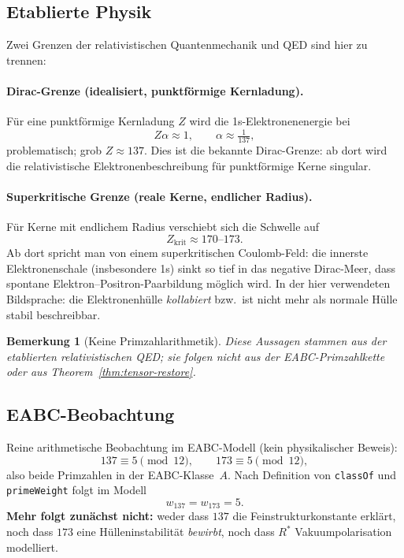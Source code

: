 \documentclass[11pt,a4paper]{article}
\newtheorem{remark}{Bemerkung}
\begin{document}
	\subsection{Etablierte Physik}
	\label{sec:supercritical-physics}
	
	Zwei Grenzen der relativistischen Quantenmechanik und QED sind hier zu trennen:
	
	\paragraph{Dirac-Grenze (idealisiert, punktförmige Kernladung).}
	Für eine punktförmige Kernladung $Z$ wird die 1s-Elektronenenergie bei
	\[
	Z\alpha \approx 1,
	\qquad
	\alpha \approx \tfrac{1}{137},
	\]
	problematisch; grob $Z\approx 137$.
	Dies ist die bekannte Dirac-Grenze: ab dort wird die relativistische
	Elektronenbeschreibung für punktförmige Kerne singular.
	
	\paragraph{Superkritische Grenze (reale Kerne, endlicher Radius).}
	Für Kerne mit endlichem Radius verschiebt sich die Schwelle auf
	\[
	Z_{\mathrm{krit}} \approx 170\text{--}173.
	\]
	Ab dort spricht man von einem superkritischen Coulomb-Feld: die innerste
	Elektronenschale (insbesondere 1s) sinkt so tief in das negative Dirac-Meer,
	dass spontane Elektron--Positron-Paarbildung möglich wird.
	In der hier verwendeten Bildsprache: die Elektronenhülle
	\emph{kollabiert} bzw.\ ist nicht mehr als normale Hülle stabil beschreibbar.
	
	\begin{remark}[Keine Primzahlarithmetik]
		Diese Aussagen stammen aus der etablierten relativistischen QED;
		sie folgen \emph{nicht} aus der EABC-Primzahlkette oder aus
		Theorem~\ref{thm:tensor-restore}.
	\end{remark}
	
	\subsection{EABC-Beobachtung}
	\label{sec:supercritical-observation}
	
	Reine arithmetische Beobachtung im EABC-Modell (kein physikalischer Beweis):
	\[
	137 \equiv 5 \pmod{12},
	\qquad
	173 \equiv 5 \pmod{12},
	\]
	also beide Primzahlen in der EABC-Klasse~$A$.
	Nach Definition von \texttt{classOf} und \texttt{primeWeight} folgt im Modell
	\[
	w_{137} = w_{173} = 5.
	\]
	\textbf{Mehr folgt zunächst nicht:}
	weder dass $137$ die Feinstrukturkonstante erklärt,
	noch dass $173$ eine Hülleninstabilität \emph{bewirbt},
	noch dass $R^*$ Vakuumpolarisation modelliert.
	
\end{document}

